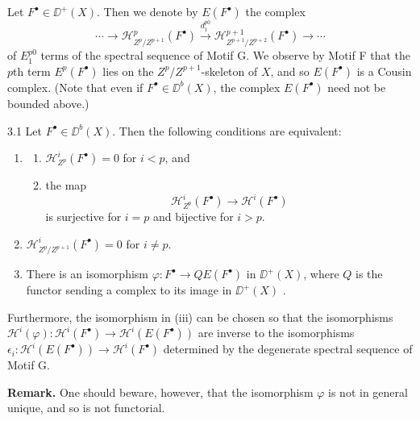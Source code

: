 \begin{definition*}
Let $F^\bullet\in\DD^+(X)$. Then we denote by $E(F^\bullet)$ the complex
\[
\cdots\longrightarrow \mathcal{H}_{Z^{p}/Z^{p+1}}^{p}(F^\bullet)\xrightarrow{d_1^{p0}} \mathcal{H}_{Z^{p+1}/Z^{p+2}}^{p+1}(F^\bullet)\longrightarrow\cdots
\]
of $E_1^{p0}$ terms of the spectral sequence of Motif G. We observe by Motif F that the $p$th term $E^p(F^\bullet)$ lies on the $Z^p/Z^{p+1}$-skeleton of $X$, and so $E(F^\bullet)$ is a Cousin complex. (Note that even if $F^\bullet\in\DD^b(X)$, the complex $E(F^\bullet)$ need not be bounded above.)
\end{definition*}

\begin{bookproposition}{3.1}\label{prop:4.3.1}
Let $F^\bullet\in\DD^b(X)$. Then the following conditions are equivalent:
\begin{enumerate}
\item[(i)]
\begin{enumerate}
\item[a)] $\mathcal{H}_{Z^p}^{i}(F^\bullet)=0$ for $i<p$, and
\item[b)] the map
\[
\mathcal{H}_{Z^p}^{i}(F^\bullet)\longrightarrow \mathcal{H}^{i}(F^\bullet)
\]
is surjective for $i=p$ and bijective for $i>p$.
\end{enumerate}
\item[(ii)] $\mathcal{H}_{Z^{p}/Z^{p+1}}^{i}(F^\bullet)=0$ for $i\neq p$.
\item[(iii)] There is an isomorphism $\varphi\colon F^\bullet\to QE(F^\bullet)$ in $\DD^+(X)$, where $Q$ is the functor sending a complex to its image in $\DD^+(X)$ .
\end{enumerate}
Furthermore, the isomorphism in (iii) can be chosen so that the isomorphisms $\mathcal{H}^{i}(\varphi)\colon \mathcal{H}^{i}(F^\bullet)\to \mathcal{H}^{i}(E(F^\bullet))$ are inverse to the isomorphisms $\epsilon_{i}\colon \mathcal{H}^{i}(E(F^\bullet))\to \mathcal{H}^{i}(F^\bullet)$ determined by the degenerate spectral sequence of Motif G.
\end{bookproposition}

\par\medskip\noindent\textbf{Remark.}
One should beware, however, that the isomorphism $\varphi$ is not in general unique, and so is not functorial.
\par\medskip

